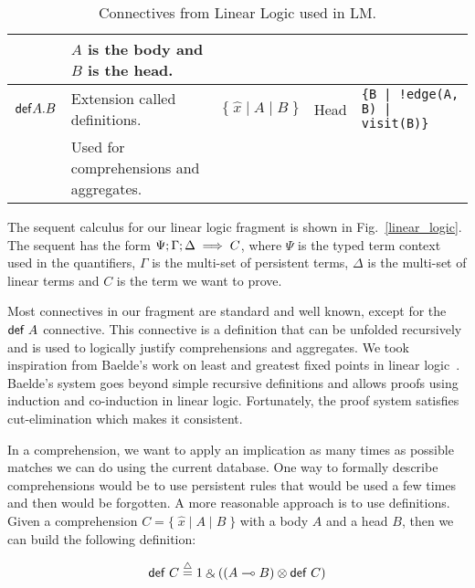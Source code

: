 \begin{table*}
\begin{center}
{\begin{tabular}{ | l | l || l | l | l |}
                                 & $A$ is the body and $B$ is the head.             &                                               &                 &                                                \\ \hline
    $\mathsf{def} A. B$               & Extension called definitions.                    & $\{\; \widehat{x} \; | \; A \; | \; B \; \}$  & Head            & \texttt{\{B | !edge(A, B) | visit(B)\}}        \\
                                 & Used for comprehensions and aggregates.          &                                               &                 &                                                \\ \hline
    \end{tabular}
}
\end{center}
\caption{Connectives from Linear Logic used in LM.}
\label{table:linear}
\end{table*}

The sequent calculus for our linear logic fragment is shown in Fig.~\ref{linear_logic}.
The sequent has the form $\Psi ; \Gamma ; \Delta \implies C$, where $\Psi$ is the typed
term context used in the quantifiers, $\Gamma$ is the multi-set of persistent terms, $\Delta$
is the multi-set of linear terms and $C$ is the term we want to prove.

Most connectives in our fragment are standard and well known, except for the $\mathsf{def} \; A$ connective. This
connective is a definition that can be unfolded recursively and is used to logically justify
comprehensions and aggregates. We took inspiration from Baelde's work on least and greatest fixed points
in linear logic~\cite{Baelde:2012:LGF:2071368.2071370}. Baelde's system goes beyond simple recursive
definitions and allows proofs using induction and co-induction in linear logic. Fortunately,
the proof system satisfies cut-elimination which makes it consistent. 

In a comprehension, we want to apply an implication as many times as possible matches we can do
using the current database. One way to formally describe comprehensions would be to use persistent
rules that would be used a few times and then would be forgotten. A more reasonable approach is to use
definitions. Given a comprehension $C = \{ \; \widehat{x} \; | \; A \; | \; B \; \}$ with a body $A$ and a head $B$, then we can build the following definition:

\[
\compr{C} \defeq 1 \with ((A \lolli B) \otimes \compr{C})
\]

